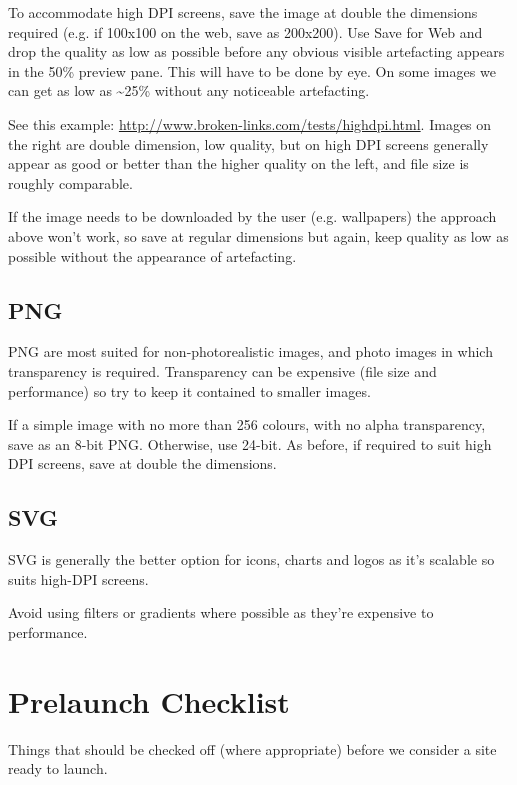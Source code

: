 \documentclass[letterpaper,10pt,english]{sphinxmanual}
\begin{document}
To accommodate high DPI screens, save the image at double the dimensions required (e.g. if 100x100 on the web, save as 200x200). Use Save for Web and drop the quality as low as possible before any obvious visible artefacting appears in the 50\% preview pane. This will have to be done by eye. On some images we can get as low as \textasciitilde{}25\% without any noticeable artefacting.

See this example: \href{http://www.broken-links.com/tests/highdpi.html}{http://www.broken-links.com/tests/highdpi.html}. Images on the right are double dimension, low quality, but on high DPI screens generally appear as good or better than the higher quality on the left, and file size is roughly comparable.

If the image needs to be downloaded by the user (e.g. wallpapers) the approach above won’t work, so save at regular dimensions but again, keep quality as low as possible without the appearance of artefacting.


\section{PNG}
\label{image_formats:png}
PNG are most suited for non-photorealistic images, and photo images in which transparency is required. Transparency can be expensive (file size and performance) so try to keep it contained to smaller images.

If a simple image with no more than 256 colours, with no alpha transparency, save as an 8-bit PNG. Otherwise, use 24-bit. As before, if required to suit high DPI screens, save at double the dimensions.


\section{SVG}
\label{image_formats:svg}
SVG is generally the better option for icons, charts and logos as it’s scalable so suits high-DPI screens.

Avoid using filters or gradients where possible as they’re expensive to performance.


\chapter{Prelaunch Checklist}
\label{prelaunch_checklist::doc}\label{prelaunch_checklist:prelaunch-checklist}
Things that should be checked off (where appropriate) before we consider a site ready to launch.
\end{document}
